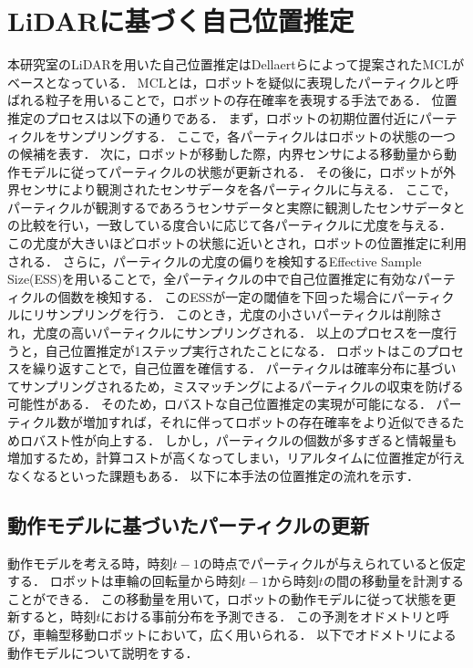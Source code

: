 \section{LiDARに基づく自己位置推定}
本研究室のLiDARを用いた自己位置推定はDellaertらによって提案されたMCL\cite{mcl}がベースとなっている．
MCLとは，ロボットを疑似に表現したパーティクルと呼ばれる粒子を用いることで，ロボットの存在確率を表現する手法である．
位置推定のプロセスは以下の通りである．
まず，ロボットの初期位置付近にパーティクルをサンプリングする．
ここで，各パーティクルはロボットの状態の一つの候補を表す．
次に，ロボットが移動した際，内界センサによる移動量から動作モデルに従ってパーティクルの状態が更新される．
その後に，ロボットが外界センサにより観測されたセンサデータを各パーティクルに与える．
ここで，パーティクルが観測するであろうセンサデータと実際に観測したセンサデータとの比較を行い，一致している度合いに応じて各パーティクルに尤度を与える．
この尤度が大きいほどロボットの状態に近いとされ，ロボットの位置推定に利用される．
さらに，パーティクルの尤度の偏りを検知するEffective Sample Size(ESS)\cite{ess}を用いることで，全パーティクルの中で自己位置推定に有効なパーティクルの個数を検知する．
このESSが一定の閾値を下回った場合にパーティクルにリサンプリングを行う．
このとき，尤度の小さいパーティクルは削除され，尤度の高いパーティクルにサンプリングされる．
以上のプロセスを一度行うと，自己位置推定が1ステップ実行されたことになる．
ロボットはこのプロセスを繰り返すことで，自己位置を確信する．
パーティクルは確率分布に基づいてサンプリングされるため，ミスマッチングによるパーティクルの収束を防げる可能性がある．
そのため，ロバストな自己位置推定の実現が可能になる．
パーティクル数が増加すれば，それに伴ってロボットの存在確率をより近似できるためロバスト性が向上する．
しかし，パーティクルの個数が多すぎると情報量も増加するため，計算コストが高くなってしまい，リアルタイムに位置推定が行えなくなるといった課題もある．
以下に本手法の位置推定の流れを示す．

\subsection{動作モデルに基づいたパーティクルの更新}
動作モデルを考える時，時刻$\displaystyle t-1$の時点でパーティクルが与えられていると仮定する．
ロボットは車輪の回転量から時刻$\displaystyle t-1$から時刻$\displaystyle t$の間の移動量を計測することができる．
この移動量を用いて，ロボットの動作モデルに従って状態を更新すると，時刻$\displaystyle t$における事前分布を予測できる．
この予測をオドメトリと呼び，車輪型移動ロボットにおいて，広く用いられる\cite{fox2005probabilistic}．
以下でオドメトリによる動作モデルについて説明をする．

